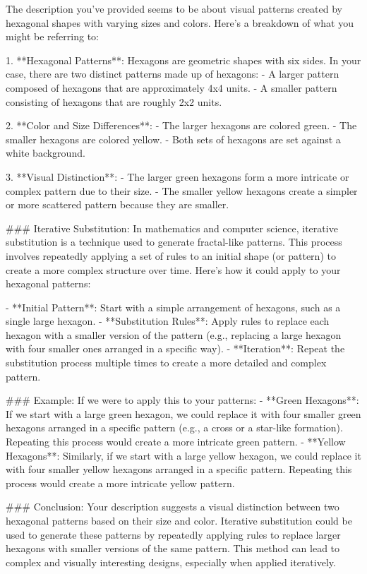 The description you've provided seems to be about visual patterns created by hexagonal shapes with varying sizes and colors. Here's a breakdown of what you might be referring to:

1. **Hexagonal Patterns**: Hexagons are geometric shapes with six sides. In your case, there are two distinct patterns made up of hexagons:
   - A larger pattern composed of hexagons that are approximately 4x4 units.
   - A smaller pattern consisting of hexagons that are roughly 2x2 units.

2. **Color and Size Differences**:
   - The larger hexagons are colored green.
   - The smaller hexagons are colored yellow.
   - Both sets of hexagons are set against a white background.

3. **Visual Distinction**:
   - The larger green hexagons form a more intricate or complex pattern due to their size.
   - The smaller yellow hexagons create a simpler or more scattered pattern because they are smaller.

### Iterative Substitution:
In mathematics and computer science, iterative substitution is a technique used to generate fractal-like patterns. This process involves repeatedly applying a set of rules to an initial shape (or pattern) to create a more complex structure over time. Here’s how it could apply to your hexagonal patterns:

- **Initial Pattern**: Start with a simple arrangement of hexagons, such as a single large hexagon.
- **Substitution Rules**: Apply rules to replace each hexagon with a smaller version of the pattern (e.g., replacing a large hexagon with four smaller ones arranged in a specific way).
- **Iteration**: Repeat the substitution process multiple times to create a more detailed and complex pattern.

### Example:
If we were to apply this to your patterns:
- **Green Hexagons**: If we start with a large green hexagon, we could replace it with four smaller green hexagons arranged in a specific pattern (e.g., a cross or a star-like formation). Repeating this process would create a more intricate green pattern.
- **Yellow Hexagons**: Similarly, if we start with a large yellow hexagon, we could replace it with four smaller yellow hexagons arranged in a specific pattern. Repeating this process would create a more intricate yellow pattern.

### Conclusion:
Your description suggests a visual distinction between two hexagonal patterns based on their size and color. Iterative substitution could be used to generate these patterns by repeatedly applying rules to replace larger hexagons with smaller versions of the same pattern. This method can lead to complex and visually interesting designs, especially when applied iteratively.